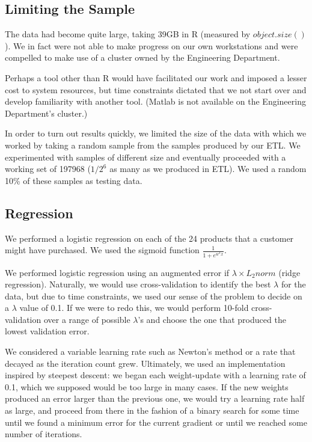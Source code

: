 \documentclass{article}
\begin{document}
\begin{spacing}{1}
\begin{large}
\subsection{Limiting the Sample}

The data had become quite large, taking 39GB in R (measured by $object.size()$). We in fact were not able to make progress on our own workstations and were compelled to make use of a cluster owned by the Engineering Department.

Perhaps a tool other than R would have facilitated our work and imposed a lesser cost to system resources, but time constraints dictated that we not start over and develop familiarity with another tool. (Matlab is not available on the Engineering Department's cluster.)

In order to turn out results quickly, we limited the size of the data with which we worked by taking a random sample from the samples produced by our ETL. We experimented with samples of different size and eventually proceeded with a working set of 197968 ($1/2^6$ as many as we produced in ETL). We used a random 10\% of these samples as testing data.

\subsection{Regression}

We performed a logistic regression on each of the 24 products that a customer might have purchased. We used the sigmoid function $\frac{1}{1+e^{w^Tx}}$.

We performed logistic regression using an augmented error if $\lambda \times L_2norm$ (ridge regression). Naturally, we would use cross-validation to identify the best $\lambda$ for the data, but due to time constraints, we used our sense of the problem to decide on a $\lambda$ value of 0.1. If we were to redo this, we would perform 10-fold cross-validation over a range of possible $\lambda$'s and choose the one that produced the lowest validation error.

We considered a variable learning rate such as Newton's method or a rate that decayed as the iteration count grew. Ultimately, we used an implementation inspired by steepest descent: we began each weight-update with a learning rate of 0.1, which we supposed would be too large in many cases. If the new weights produced an error larger than the previous one, we would try a learning rate half as large, and proceed from there in the fashion of a binary search for some time until we found a minimum error for the current gradient or until we reached some number of iterations.


\end{large}
\end{spacing}
\end{document}
